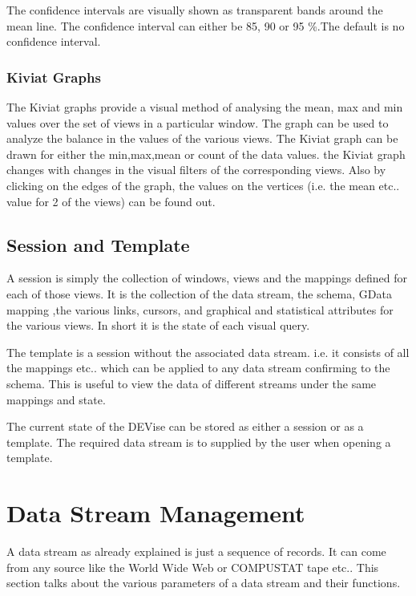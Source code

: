 The confidence intervals are visually shown as transparent bands around the mean line. The confidence interval can either be 85, 90  or 95 \%.The default is no confidence interval.

\subsubsection{Kiviat Graphs}

The Kiviat graphs provide a visual method of analysing the mean, max and min values over the set of views in a particular window. The graph can be used to analyze the balance in the values of the various views. The Kiviat graph can be drawn for either the min,max,mean or count of the data values. the Kiviat graph changes with changes in the visual filters of the corresponding views. Also by clicking on the edges of the graph, the values on the vertices (i.e. the mean etc.. value for 2 of the views) can be found out. 

\subsection{Session and Template}

A session is simply the collection of windows, views and the mappings defined for each of those views. It is the collection of the data stream, the schema, GData  mapping ,the various links, cursors, and graphical and statistical attributes for the various views. In short it is the state of each visual query. 

The template is a session without the associated data stream. i.e. it consists of all the mappings etc.. which can be applied to any data stream confirming to the schema. This is useful to view the data of different streams under the same mappings and state.

The current state of the DEVise can be stored as either a session or as a template. The required data stream is to supplied by the user when opening a template.

\section{Data Stream Management}

A data stream as already explained is just a sequence of records. It can come from any source like the World Wide Web or COMPUSTAT tape etc.. This section talks about the various parameters of a data stream and their functions.

